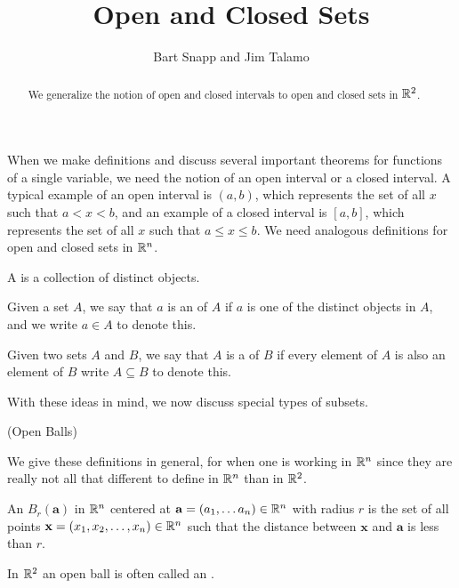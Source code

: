 \documentclass{ximera}
\author{Bart Snapp and Jim Talamo}
\title[Dig-In:]{Open and Closed Sets}
\begin{document}
\begin{abstract}
We generalize the notion of open and closed intervals to open and closed sets in $\mathbb R^2$.
\end{abstract}
\maketitle



When we make definitions and discuss several important theorems for functions of a single variable, 
we need the notion of an open interval or a closed interval.  A typical example of an open interval is $(a,b)$, which represents the set
of all $x$ such that $a<x<b$, and an example of a closed interval is $[a,b]$, which represents the set of all $x$ such that $a\leq x\leq
b$. We need analogous definitions for open and closed sets in $\mathbb R^n$.

\begin{definition} 
A  is a collection of distinct objects.

Given a set $A$, we say that $a$ is an  of $A$ if $a$ is one of the distinct objects in $A$, and we write $a \in A$ to denote this.

Given two sets $A$ and $B$, we say that $A$ is a  of $B$ if every element of $A$ is also an element of $B$ write $A \subseteq B$ to denote this.

\end{definition}

With these ideas in mind, we now discuss special types of subsets.

\begin{definition} (Open Balls)

  We give these definitions in general, for when one is working in
  $\mathbb R^n$ since they are really not all that different to define in $\mathbb R^n$ than in $\mathbb R^2$.

 An  $B_r(\mathbf{a})$ in $\mathbb R^n$ centered at $\mathbf{a} =\left(a_1,\dots a_n\right) \in \mathbb R^n$ with radius $r$ is the set of all  points $\mathbf{x} = \left(x_1,x_2,\dots,x_n\right) \in \mathbb R^n$ such that the distance between $\mathbf{x}$ and $\mathbf{a}$ is less than $r$.
    
    In $\mathbb R^2$ an open ball is often called an
    .
    \begin{image}
    \end{image}
 
 \end{definition}
 
\end{document}

